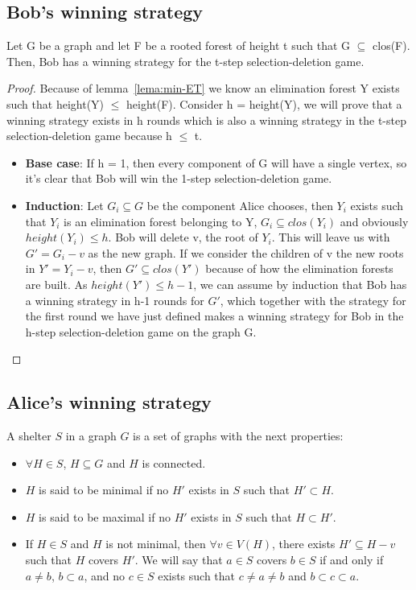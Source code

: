 \subsection{Bob's winning strategy}
\begin{lemma}
Let G be a graph and let F be a rooted forest of height t such that G $\subseteq$ clos(F). Then, Bob has a winning strategy for the t-step selection-deletion game.
\label{lemma:Bob-win}
\end{lemma}
\begin{proof}
Because of lemma~\ref{lema:min-ET} we know an elimination forest Y exists such that height(Y) $\leq$ height(F).
Consider h = height(Y), we will prove that a winning strategy exists in h rounds which is also a winning strategy in the t-step selection-deletion game because h $\leq$ t.
\begin{itemize}
  \item \textbf{Base case}: If h = 1, then every component of G will have a single vertex, so it's clear that Bob will win the 1-step selection-deletion game.
  \item \textbf{Induction}: Let $G_i \subseteq G$ be the component Alice chooses, then $Y_i$ exists such that $Y_i$ is an elimination forest belonging to Y, $G_i \subseteq clos(Y_i)$ and obviously $height(Y_i) \leq h$. Bob will delete v, the root of $Y_i$. This will leave us with $G' = G_i - v$ as the new graph. If we consider the children of v the new roots in $Y' = Y_i - v$, then $G' \subseteq clos(Y')$ because of how the elimination forests are built. As $height(Y') \leq h-1$, we can assume by induction that Bob has a winning strategy in h-1 rounds for $G'$, which together with the strategy for the first round we have just defined makes a winning strategy for Bob in the h-step selection-deletion game on the graph G.
\end{itemize}
\end{proof}

\subsection{Alice's winning strategy}
\begin{definition}
A shelter $S$ in a graph $G$ is a set of graphs with the next properties:
\begin{itemize}
  \item $\forall H \in S$, $H \subseteq G$ and $H$ is connected.
  \item $H$ is said to be minimal if no $H'$ exists in $S$ such that $H' \subset H$.
  \item $H$ is said to be maximal if no $H'$ exists in $S$ such that $H \subset H'$.
  \item If $H \in S$ and $H$ is not minimal, then $\forall v \in V(H)$, there exists $H' \subseteq H - v$ such that $H$ covers $H'$. We will say that $a \in S$ covers $b \in S$ if and only if $a \neq b$, $b \subset a$, and no $c \in S$ exists such that $c \neq a \neq b$ and $b \subset c \subset a$.
\end{itemize}
\end{definition}


